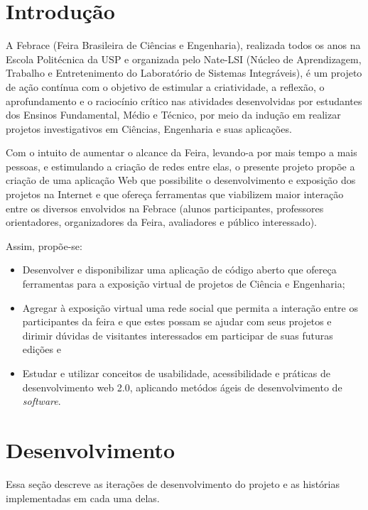 \documentclass[a4paper,12pt,font=plain,header=plain]{abnt}
\begin{document}
	\chapter{Introdução}
	
	A Febrace (Feira Brasileira de Ciências e Engenharia), realizada todos os anos na Escola Politécnica da USP e organizada pelo Nate-LSI (Núcleo de Aprendizagem, Trabalho e Entretenimento do Laboratório de Sistemas Integráveis), é um projeto de ação contínua com o objetivo de estimular a criatividade, a reflexão, o aprofundamento e o raciocínio crítico nas atividades desenvolvidas por estudantes dos Ensinos Fundamental, Médio e Técnico, por meio da indução em realizar projetos investigativos em Ciências, Engenharia e suas aplicações.
	
	Com o intuito de aumentar o alcance da Feira, levando-a por mais tempo a mais pessoas, e estimulando a criação de redes entre elas, o presente projeto propõe a criação de uma aplicação Web que possibilite o desenvolvimento e exposição dos projetos na Internet e que ofereça ferramentas que viabilizem maior interação entre os diversos envolvidos na Febrace (alunos participantes, professores orientadores, organizadores da Feira, avaliadores e público interessado).
	
	Assim, propõe-se:
	
	\begin{itemize}
	\item{
		Desenvolver e disponibilizar uma aplicação de código aberto que ofereça ferramentas para a exposição virtual de projetos de Ciência e Engenharia;
	}
	\item{
		Agregar à exposição virtual uma rede social que permita a interação entre os participantes da feira e que estes possam se ajudar com seus projetos e dirimir dúvidas de visitantes interessados em participar de suas futuras edições e
	}
	\item{
		Estudar e utilizar conceitos de usabilidade, acessibilidade e práticas de desenvolvimento web 2.0, aplicando metódos ágeis de desenvolvimento de \textit{software}.
	}
	\end{itemize}

\chapter{Desenvolvimento}

  Essa seção descreve as iterações de desenvolvimento do projeto e as histórias implementadas em cada uma delas.
\end{document}
